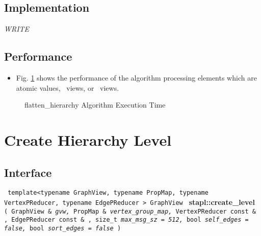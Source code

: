 \subsection{Implementation} \label{sec-flat-hier-alg-impl}

\textit{WRITE}

\subsection{Performance} \label{sec-flat-hier-alg-perf}

\begin{itemize}
\item
Fig. \ref{fig:flat-hier-alg-exec-exper}
shows the performance of the algorithm processing
elements which are atomic values, \stl\ views, or \stapl\ views.
\end{itemize}

\begin{figure}[p]
\caption{ flatten\_hierarchy Algorithm Execution Time}
\label{fig:flat-hier-alg-exec-exper}
\end{figure}


\section{ Create Hierarchy Level}
\label{sec-create-level-alg}

\subsection{Interface} \label{sec-create-level-alg-inter}

\noindent
\texttt{%
template<typename GraphView, typename PropMap, 
\newline
typename VertexPReducer, typename EdgePReducer >
\newline
GraphView 
}
\newline
\textbf{stapl::create\_level}%
\newline
\texttt{%
(
GraphView \&
\textit{gvw,}%
PropMap \&
\textit{vertex\_group\_map,}%
VertexPReducer const \& ,
EdgePReducer const \& ,
size\_t
\textit{max\_msg\_sz = 512,}%
bool
\textit{self\_edges = false,}%
bool
\textit{sort\_edges = false}%
)     
}
\vspace{0.4cm}

